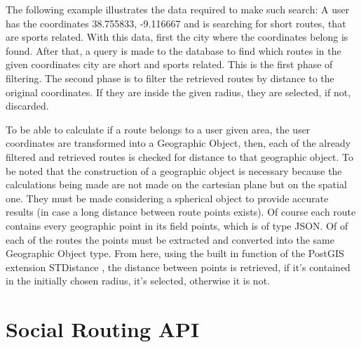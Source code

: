     The following example illustrates the data required to make such search:
    A user has the coordinates 38.755833, -9.116667 and is searching for short routes, that are sports related.
    With this data, first the city where the coordinates belong is found. After that, a query is made to the database
    to find which routes in the given coordinates city are short and sports related. This is the first phase of filtering.
    The second phase is to filter the retrieved routes by distance to the original coordinates. If they are inside the 
    given radius, they are selected, if not, discarded.

    To be able to calculate if a route belongs to a user given area, the user coordinates are transformed into a Geographic Object\cite{geographicobject},
    then, each of the already filtered and retrieved routes is checked for distance to that geographic object. To be noted that the construction of a geographic
    object is necessary because the calculations being made are not made on the cartesian plane but on the spatial one. They must be made considering a spherical 
    object to provide accurate results (in case a long distance between route points exists). Of course each route contains every geographic point in its field points,
    which is of type JSON. Of of each of the routes the points must be extracted and converted into the same Geographic Object type. From here, using the built in function
    of the PostGIS extension STDistance \cite{stdistance}, the distance between points is retrieved, if it's contained in the initially 
    chosen radius, it's selected, otherwise it is not.

\section*{Social Routing API} \label{apisection}   
